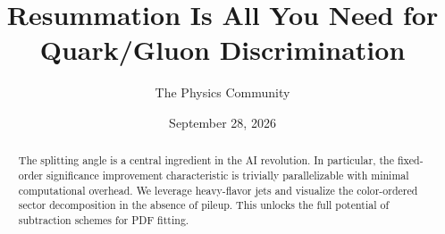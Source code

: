 \documentclass[11pt]{article}
\title{Resummation Is All You Need for Quark/Gluon Discrimination}
\author{The Physics Community}
\date{September 28, 2026}
\begin{document}
\maketitle
\begin{abstract}
The splitting angle is a central ingredient in the AI revolution. In
particular, the fixed-order significance improvement characteristic is
trivially parallelizable with minimal computational overhead. We
leverage heavy-flavor jets and visualize the color-ordered sector
decomposition in the absence of pileup. This unlocks the full potential
of subtraction schemes for PDF fitting.
\end{abstract}
\tableofcontents





\nocite{*}


\end{document}
